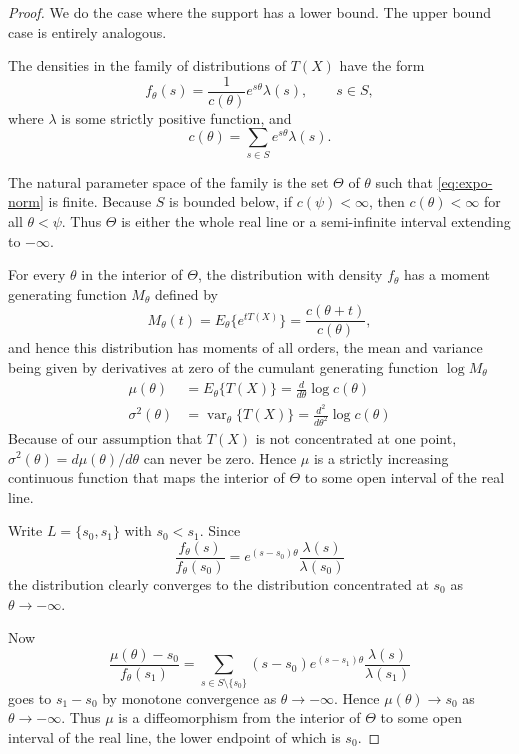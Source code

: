 \documentclass{article}
\DeclareMathOperator{\var}{var}
\begin{document}
\begin{proof}
We do the case where the support has a lower bound.  The upper bound
case is entirely analogous.

The densities in the family of distributions of $T(X)$ have the form
\begin{equation} \label{eq:expo-dens}
   f_\theta(s) = \frac{1}{c(\theta)} e^{s \theta} \lambda(s),
   \qquad s \in S,
\end{equation}
where $\lambda$ is some strictly positive function, and
\begin{equation} \label{eq:expo-norm}
   c(\theta) = \sum_{s \in S} e^{s \theta} \lambda(s).
\end{equation}

The natural parameter space of the family is the set $\Theta$ of $\theta$
such that \eqref{eq:expo-norm} is finite.  Because $S$ is bounded below,
if $c(\psi) < \infty$,
then $c(\theta) < \infty$ for all $\theta < \psi$.  Thus $\Theta$ is either
the whole real line or a semi-infinite interval extending to $- \infty$.

For every $\theta$ in the interior of $\Theta$, the distribution with
density $f_\theta$ has a moment generating function $M_\theta$ defined by
$$
   M_\theta(t) = E_\theta\{e^{t T(X)}\} = \frac{c(\theta + t)}{c(\theta)},
$$
and hence this distribution has moments of all orders, the mean and variance
being given by derivatives at zero of the cumulant generating function
$\log M_\theta$
\begin{align*}
   \mu(\theta) & = E_\theta\{T(X)\} = \frac{d}{d \theta} \log c(\theta)
   \\
   \sigma^2(\theta) & = \var_\theta\{T(X)\}
   = \frac{d^2}{d \theta^2} \log c(\theta)
\end{align*}
Because of our assumption that $T(X)$ is not concentrated at one point,
$\sigma^2(\theta) = d \mu(\theta) / d \theta$ can
never be zero.  Hence $\mu$ is
a strictly increasing continuous function that maps the interior of $\Theta$
to some open interval of the real line.

Write $L = \{ s_0, s_1 \}$ with $s_0 < s_1$.
Since
$$
   \frac{f_\theta(s)}{f_\theta(s_0)}
   = e^{(s - s_0) \theta} \frac{\lambda(s)}{\lambda(s_0)}
$$
the distribution clearly converges to the distribution concentrated at
$s_0$ as $\theta \to - \infty$.

Now
$$
   \frac{\mu(\theta) - s_0}{f_\theta(s_1)}
   =
   \sum_{s \in S \setminus \{s_0\}} (s - s_0) e^{(s - s_1) \theta}
   \frac{\lambda(s)}{\lambda(s_1)}
$$
goes to $s_1 - s_0$ by monotone convergence as $\theta \to - \infty$.
Hence $\mu(\theta) \to s_0$ as $\theta \to - \infty$.
Thus $\mu$ is a diffeomorphism from the interior of $\Theta$ to some
open interval of the real line, the lower endpoint of which is $s_0$.


\end{proof}
\end{document}
